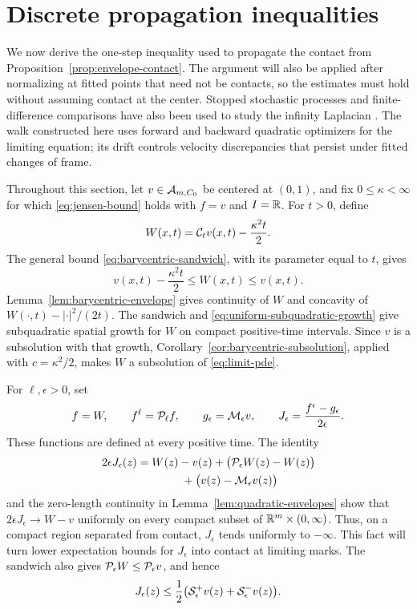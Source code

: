 \section{Discrete propagation inequalities}\label{sec:discrete-propagation}

We now derive the one-step inequality used to propagate the contact from
Proposition~\ref{prop:envelope-contact}. The argument will also be applied
after normalizing at fitted points that need not be contacts, so the
estimates must hold without assuming contact at the center.
Stopped stochastic processes and finite-difference comparisons have also
been used to study the infinity Laplacian
\cite{PeresSchrammSheffieldWilson2009,ArmstrongSmart2010}.
The walk constructed here uses forward and backward quadratic optimizers
for the limiting equation; its drift controls velocity discrepancies
that persist under fitted changes of frame.

Throughout this section, let $v\in\mathcal{A}_{m,C_0}$ be centered at $(0,1)$,
and fix $0\le\kappa<\infty$ for which \eqref{eq:jensen-bound} holds with
$f=v$ and $I=\mathbb{R}$.  For $t>0$, define
\[
  W(x,t)=\mathcal{C}_t v(x,t)-\frac{\kappa^2t}{2}.
\]
The general bound \eqref{eq:barycentric-sandwich}, with its parameter equal
to $t$, gives
\[
  v(x,t)-\frac{\kappa^2t}{2}\le W(x,t)\le v(x,t).
\]
Lemma~\ref{lem:barycentric-envelope} gives continuity of $W$ and concavity of
$W(\cdot,t)-|\cdot|^2/(2t)$.  The sandwich and
\eqref{eq:uniform-subquadratic-growth} give subquadratic spatial growth for
$W$ on compact positive-time intervals.  Since $v$ is a subsolution with
that growth, Corollary~\ref{cor:barycentric-subsolution}, applied with
$c=\kappa^2/2$, makes $W$ a subsolution of \eqref{eq:limit-pde}.

For $\ell,\epsilon>0$, set
\begin{equation}\label{eq:dp-auxiliary}
  f=W,\qquad f^\ell=\mathcal{P}_\ell f,\qquad
  g_\epsilon=\mathcal{M}_\epsilon v,\qquad
  J_\epsilon=\frac{f^\epsilon-g_\epsilon}{2\epsilon}.
\end{equation}
These functions are defined at every positive time.  The identity
\begin{equation}\label{eq:dp-contact-gap}
\begin{split}
  2\epsilon J_\epsilon(z)
  &=W(z)-v(z)+\bigl(\mathcal{P}_\epsilon W(z)-W(z)\bigr)\\
  &\hspace{4em}+\bigl(v(z)-\mathcal{M}_\epsilon v(z)\bigr)
\end{split}
\end{equation}
and the zero-length continuity in Lemma~\ref{lem:quadratic-envelopes} show
that $2\epsilon J_\epsilon\to W-v$ uniformly on every compact subset of
$\mathbb{R}^m\times(0,\infty)$.  Thus, on a compact region separated from contact,
$J_\epsilon$ tends uniformly to $-\infty$.  This fact will turn lower
expectation bounds for $J_\epsilon$ into contact at limiting marks.
The sandwich also gives $\mathcal{P}_\epsilon W\le\mathcal{P}_\epsilon v$, and hence
\begin{equation}\label{eq:dp-J-bounds}
  J_\epsilon(z)\le
  \frac12\bigl(\mathcal{S}^+_\epsilon v(z)+\mathcal{S}^-_\epsilon v(z)\bigr).
\end{equation}

